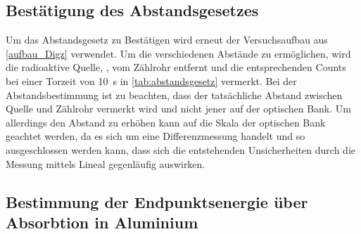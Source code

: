 \documentclass[12pt,english,ngerman]{scrartcl}
\begin{document}
\begin{table}[H]
  \caption{Tabelle der Zählstatistik}
  \label{tab:zahlstatistik}
  \begin{center}
    
  \end{center}
\end{table}


\subsection{Bestätigung des Abstandsgesetzes}

Um das Abstandsgesetz zu Bestätigen wird erneut der Versuchsaufbau aus
\autoref{aufbau_Digz} verwendet. Um die verschiedenen Abstände zu ermöglichen,
wird die radioaktive Quelle, , vom Zählrohr entfernt
und die entsprechenden Counts bei einer Torzeit von \SI{10}{\second} in
\autoref{tab:abstandsgesetz} vermerkt. Bei der Abstandsbestimmung ist zu
beachten, dass der tatsächliche Abstand zwischen Quelle und Zählrohr vermerkt
wird und nicht jener auf der optischen Bank. Um allerdings den Abstand zu
erhöhen kann auf die Skala der optischen Bank geachtet werden, da es sich um
eine Differenzmessung handelt und so ausgeschlossen werden kann, dass sich die
entstehenden Unsicherheiten durch die Messung mittels Lineal gegenläufig
auswirken.

\begin{table}[H]
  \caption[Erhaltene Zählraten bei unterschiedlichen Abständen der Quelle]{Erhaltene Zählraten bei unterschiedlichen Abständen der Quelle
   bei einer Torzeit von \SI{10}{\second}. Die Unsicherheit beträgt dabei für alle Zählraten \SI{}{} \\
  $ l_{\mathrm{Quelle}} \dots$ Abstand der radioaktiven Quelle in cm \\
  $ z_{i} \dots$ erhaltene Zählrate bei entsprechendem Abstand}

  \label{tab:abstandsgesetz}
  \begin{center}
    
  \end{center}
\end{table}


\subsection{Bestimmung der Endpunktsenergie über Absorbtion in Aluminium}
\end{document}
